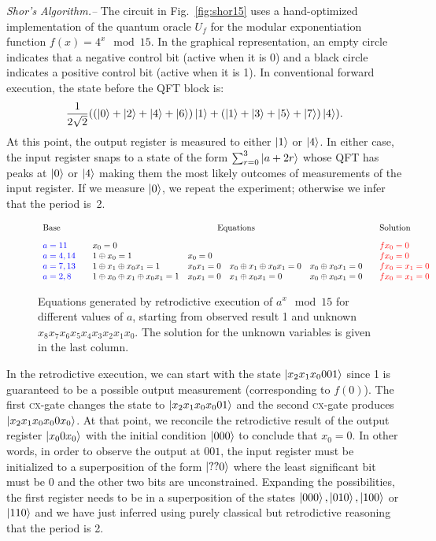 \documentclass[aps,prl,twocolumn,superscriptaddress,floatfix,notitlepage]{revtex4-2}
\newcommand{\cx}{\textsc{cx}}
\newcommand{\red}[1]{{\color{red}{f#1}}}
\newcommand{\blue}[1]{{\color{blue}{#1}}}
\begin{document}
{\it Shor's Algorithm.--}
The circuit in Fig.~\ref{fig:shor15} uses a hand-optimized
implementation of the quantum oracle $U_f$ for the modular exponentiation
function $f(x) = 4^x \mod{15}$. In the graphical representation, an empty circle 
indicates that a negative control bit (active when it is 0) 
and a black circle indicates a positive control bit (active when it is 1). In conventional
forward execution, the state before the QFT block is:
\[
\frac{1}{2\sqrt{2}} (
  (\ket{0} + \ket{2} + \ket{4} + \ket{6}) \ket{1} + 
  (\ket{1} + \ket{3} + \ket{5} + \ket{7}) \ket{4}
  ) .
\]
At this point, the output register is measured to either $\ket{1}$ or
$\ket{4}$. In either case, the input register snaps to a state
of the form $\sum_{r=0}^3 \ket{a+2r}$ whose QFT has peaks at $\ket{0}$
or $\ket{4}$ making them the most likely outcomes of measurements of
the input register. If we measure $\ket{0}$, we repeat the
experiment; otherwise we infer that the period is~2.


\begin{figure}[t]
\[\begin{array}{l@{\qquad}llll@{\qquad}l}
\textrm{Base} & \multicolumn{4}{c}{\textrm{Equations}} & \textrm{Solution} \\[2ex]
\blue{a=11} & x_0 = 0 &&&& \red{x_0 = 0} \\
\blue{a=4,14} & 1 \oplus x_0 = 1 & x_0 = 0 &&
  & \red{x_0 = 0} \\
\blue{a=7,13} & 1 \oplus x_1 \oplus x_0x_1 = 1 & x_0x_1 = 0 & x_0 \oplus x_1 \oplus x_0x_1 = 0 &  x_0 \oplus x_0x_1 = 0 & \red{x_0=x_1=0} \\
\blue{a=2,8} & 1 \oplus x_0 \oplus x_1 \oplus x_0x_1 = 1 & x_0x_1 = 0 & x_1 \oplus x_0x_1 = 0 & x_0 \oplus x_0x_1 = 0  & \red{x_0=x_1=0} 
\end{array}\]
\caption{Equations generated by retrodictive
  execution of $a^x \mod{15}$ for different values of $a$, starting
  from observed result 1 and unknown
  $x_8x_7x_6x_5x_4x_3x_2x_1x_0$. The solution for the unknown
  variables is given in the last column.}
  \label{fig:shor-eqs}
\end{figure}

In the retrodictive execution, we can start with the state
$\ket{x_2x_1x_0001}$ since 1 is guaranteed to be a possible output
measurement (corresponding to $f(0)$). The first \cx-gate changes the
state to $\ket{x_2x_1x_0x_001}$ and the second \cx-gate produces
$\ket{x_2x_1x_0x_00x_0}$. At that point, we reconcile the retrodictive
result of the output register $\ket{x_00x_0}$ with the initial
condition $\ket{000}$ to conclude that $x_0=0$. In other words, in
order to observe the output at $001$, the input register must
be initialized to a superposition of the form $\ket{??0}$ where the
least significant bit must be 0 and the other two bits are
unconstrained. Expanding the possibilities, the first register needs
to be in a superposition of the states $\ket{000}, \ket{010},
\ket{100}$ or $\ket{110}$ and we have just inferred using purely
classical but retrodictive reasoning that the period is
2.
\end{document}
